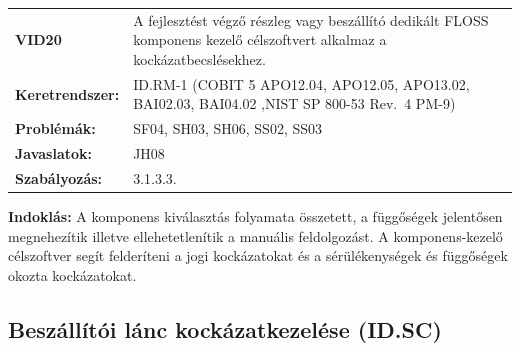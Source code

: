 \documentclass[12pt,magyar,a4paper,oneside]{scrreprt}
\begin{document}
\begin{longtable}[]{@{}ll@{}}
\toprule
\endhead
\begin{minipage}[t]{0.16\columnwidth}\raggedright
\textbf{VID20}\strut
\end{minipage} & \begin{minipage}[t]{0.79\columnwidth}\raggedright
A fejlesztést végző részleg vagy beszállító dedikált FLOSS komponens
kezelő célszoftvert alkalmaz a kockázatbecslésekhez.\strut
\end{minipage}\tabularnewline
\begin{minipage}[t]{0.16\columnwidth}\raggedright
\textbf{Keretrendszer:}\strut
\end{minipage} & \begin{minipage}[t]{0.79\columnwidth}\raggedright
ID.RM-1 (COBIT 5 APO12.04, APO12.05, APO13.02, BAI02.03, BAI04.02 ,NIST
SP 800-53 Rev.~4 PM-9)\strut
\end{minipage}\tabularnewline
\begin{minipage}[t]{0.16\columnwidth}\raggedright
\textbf{Problémák:}\strut
\end{minipage} & \begin{minipage}[t]{0.79\columnwidth}\raggedright
SF04, SH03, SH06, SS02, SS03\strut
\end{minipage}\tabularnewline
\begin{minipage}[t]{0.16\columnwidth}\raggedright
\textbf{Javaslatok:}\strut
\end{minipage} & \begin{minipage}[t]{0.79\columnwidth}\raggedright
JH08\strut
\end{minipage}\tabularnewline
\begin{minipage}[t]{0.16\columnwidth}\raggedright
\textbf{Szabályozás:}\strut
\end{minipage} & \begin{minipage}[t]{0.79\columnwidth}\raggedright
3.1.3.3.\strut
\end{minipage}\tabularnewline
\bottomrule
\end{longtable}

\textbf{Indoklás: } A komponens kiválasztás folyamata összetett, a
függőségek jelentősen megnehezítik illetve ellehetetlenítik a manuális
feldolgozást. A komponens-kezelő célszoftver segít felderíteni a jogi
kockázatokat és a sérülékenységek és függőségek okozta kockázatokat.

\hypertarget{beszuxe1lluxedtuxf3i-luxe1nc-kockuxe1zatkezeluxe9se-id.sc}{%
\subsection{Beszállítói lánc kockázatkezelése
(ID.SC)}\label{beszuxe1lluxedtuxf3i-luxe1nc-kockuxe1zatkezeluxe9se-id.sc}}
\end{document}
